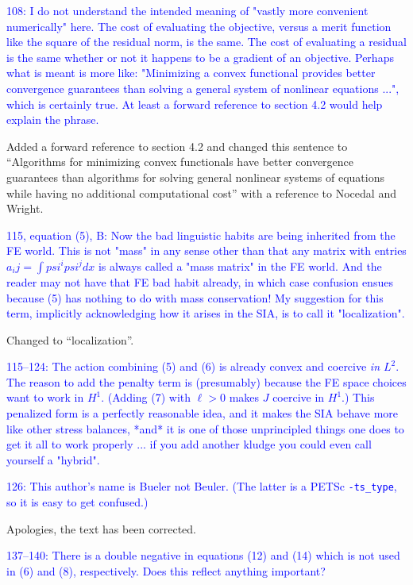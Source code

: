 \documentclass{article}
\theoremstyle{definition}
\theoremstyle{plain}
\begin{document}
\textcolor{blue}{108:  I do not understand the intended meaning of "vastly more convenient numerically" here.  The cost of evaluating the objective, versus a merit function like the square of the residual norm, is the same.  The cost of evaluating a residual is the same whether or not it happens to be a gradient of an objective.  Perhaps what is meant is more like: "Minimizing a convex functional provides better convergence guarantees than solving a general system of nonlinear equations ...", which is certainly true.  At least a forward reference to section 4.2 would help explain the phrase.}

Added a forward reference to section 4.2 and changed this sentence to ``Algorithms for minimizing convex functionals have better convergence guarantees than algorithms for solving general nonlinear systems of equations while having no additional computational cost'' with a reference to Nocedal and Wright.

\textcolor{blue}{115, equation (5), B:  Now the bad linguistic habits are being inherited from the FE world.  This is not "mass" in any sense other than that any matrix with entries $a_ij = \int psi^i psi^j dx$ is always called a "mass matrix" in the FE world.  And the reader may not have that FE bad habit already, in which case confusion ensues because (5) has nothing to do with mass conservation!  My suggestion for this term, implicitly acknowledging how it arises in the SIA, is to call it "localization".}

Changed to ``localization''.

\textcolor{blue}{115--124:  The action combining (5) and (6) is already convex and coercive \emph{in $L^2$}.  The reason to add the penalty term is (presumably) because the FE space choices want to work in $H^1$.  (Adding (7) with $\ell > 0$ makes $J$ coercive in $H^1$.)  This penalized form is a perfectly reasonable idea, and it makes the SIA behave more like other stress balances, *and* it is one of those unprincipled things one does to get it all to work properly ... if you add another kludge you could even call yourself a "hybrid".}

\textcolor{blue}{126:  This author's name is Bueler not Beuler.  (The latter is a PETSc \texttt{-ts\_type}, so it is easy to get confused.)}

Apologies, the text has been corrected.

\textcolor{blue}{137--140:  There is a double negative in equations (12) and (14) which is not used in (6) and (8), respectively.  Does this reflect anything important?}
\end{document}
